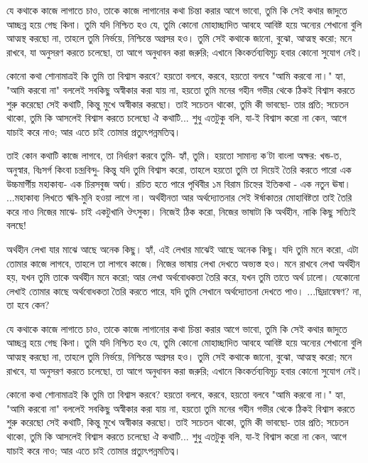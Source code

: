 যে কথাকে কাজে লাগাতে চাও, তাকে কাজে লাগানোর কথা চিন্তা করার আগে ভাবো, তুমি কি সেই কথার জাদুতে আচ্ছন্ন হয়ে গেছ কিনা। তুমি যদি নিশ্চিত হও যে, তুমি কোনো মোহাচ্ছাদিত আবহে আবিষ্ট হয়ে অন্যের শেখানো বুলি আত্মস্থ করছো না, তাহলে তুমি নির্ভয়ে, নিশ্চিন্তে অগ্রসর হও। তুমি সেই কথাকে জানো, বুঝো, আত্মস্থ করো; মনে রাখবে, যা অনুসরণ করতে চলেছো, তা আগে অনুধাবন করা জরুরি; এখানে কিংকর্তব্যবিমূঢ় হবার কোনো সুযোগ নেই।

কোনো কথা শোনামাত্রই কি তুমি তা বিশ্বাস করবে? হয়তো বলবে, করবে, হয়তো বলবে "আমি করবো না।" হ্যা, "আমি করবো না" বললেই সবকিছু অস্বীকার করা যায় না, হয়তো তুমি মনের গহীন গভীর থেকে ঠিকই বিশ্বাস করতে শুরু করেছো সেই কথাটি, কিন্তু মুখে অস্বীকার করছো। তাই সচেতন থাকো, তুমি কী ভাবছো- তার প্রতি; সচেতন থাকো, তুমি কি আসলেই বিশ্বাস করতে চলেছো ঐ কথাটি... শুধু এতটুকু বলি, যা-ই বিশ্বাস করো না কেন, আগে যাচাই করে নাও; আর এতে চাই তোমার প্রত্যুৎপন্নমতিত্ব।

তাই কোন কথাটি কাজে লাগবে, তা নির্ধারণ করবে তুমি- হ্যাঁ, তুমি। হয়তো সামান্য ক'টা বাংলা অক্ষর: খন্ড-ত, অনুস্বার, বিঃসর্গ কিংবা চন্দ্রবিন্দু- কিন্তু যদি তুমি বিশ্বাস করো, তাহলে হয়তো তুমি তা দিয়েই তৈরি করতে পারো এক উচ্চমার্গীয় মহাকাব্য- এক চিরসবুজ অর্ঘ্য। রচিত হতে পারে পৃথিবীর ১ম বিরাম চিহ্নের ইতিকথা - এক নতুন ঊষা। ...মহাকাব্য লিখতে ঋষি-মুনি হওয়া লাগে না।
অর্থহীনতা আর অর্থদ্যোতনার সেই ঈর্ষাকাতর মোহাবিষ্টতা তাই তৈরি করে নাও নিজের মাঝে- চাই একটুখানি ঔৎসুক্য। নিজেই ঠিক করো, নিজের ভাষাটা কি অর্থহীন, নাকি কিছু সত্যিই বলছে!

অর্থহীন লেখা যার মাঝে আছে অনেক কিছু। হ্যাঁ, এই লেখার মাঝেই আছে অনেক কিছু। যদি তুমি মনে করো, এটা তোমার কাজে লাগবে, তাহলে তা লাগবে কাজে। নিজের ভাষায় লেখা দেখতে অভ্যস্ত হও। মনে রাখবে লেখা অর্থহীন হয়, যখন তুমি তাকে অর্থহীন মনে করো; আর লেখা অর্থবোধকতা তৈরি করে, যখন তুমি তাতে অর্থ ঢালো। যেকোনো লেখাই তোমার কাছে অর্থবোধকতা তৈরি করতে পারে, যদি তুমি সেখানে অর্থদ্যোতনা দেখতে পাও। ...ছিদ্রান্বেষণ? না, তা হবে কেন?

যে কথাকে কাজে লাগাতে চাও, তাকে কাজে লাগানোর কথা চিন্তা করার আগে ভাবো, তুমি কি সেই কথার জাদুতে আচ্ছন্ন হয়ে গেছ কিনা। তুমি যদি নিশ্চিত হও যে, তুমি কোনো মোহাচ্ছাদিত আবহে আবিষ্ট হয়ে অন্যের শেখানো বুলি আত্মস্থ করছো না, তাহলে তুমি নির্ভয়ে, নিশ্চিন্তে অগ্রসর হও। তুমি সেই কথাকে জানো, বুঝো, আত্মস্থ করো; মনে রাখবে, যা অনুসরণ করতে চলেছো, তা আগে অনুধাবন করা জরুরি; এখানে কিংকর্তব্যবিমূঢ় হবার কোনো সুযোগ নেই।

কোনো কথা শোনামাত্রই কি তুমি তা বিশ্বাস করবে? হয়তো বলবে, করবে, হয়তো বলবে "আমি করবো না।" হ্যা, "আমি করবো না" বললেই সবকিছু অস্বীকার করা যায় না, হয়তো তুমি মনের গহীন গভীর থেকে ঠিকই বিশ্বাস করতে শুরু করেছো সেই কথাটি, কিন্তু মুখে অস্বীকার করছো। তাই সচেতন থাকো, তুমি কী ভাবছো- তার প্রতি; সচেতন থাকো, তুমি কি আসলেই বিশ্বাস করতে চলেছো ঐ কথাটি... শুধু এতটুকু বলি, যা-ই বিশ্বাস করো না কেন, আগে যাচাই করে নাও; আর এতে চাই তোমার প্রত্যুৎপন্নমতিত্ব।